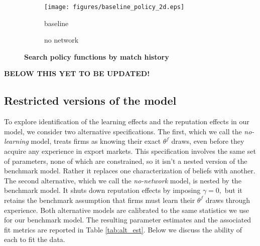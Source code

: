 \documentclass[12pt,titlepage]{article}
\begin{document}
\begin{figure}[tbp]
\centering%
\begin{subfigure}[b]{0.7\textwidth}
        \texttt{[image: figures/baseline\_policy\_2d.eps]}
        \caption{baseline}
        \label{fig:baseline_search_policy}
    \end{subfigure}
\par
\begin{subfigure}[b]{0.7\textwidth}
        \caption{no network}
        \label{fig:no_network_search_policy}
    \end{subfigure}
\caption{\textbf{Search policy functions by match history}}
\label{fig:search_policy_outer}
\end{figure}

\bigskip

\textbf{BELOW THIS YET TO BE UPDATED!}

\subsection{Restricted versions of the model}

To explore identification of the learning effects and the reputation effects
in our model, we consider two alternative specifications. The first, which
we call the \textit{no-learning} model, treats firms as knowing their exact $%
\theta ^{f}$ draws, even before they acquire any experience in export
markets. This specification involves the same set of parameters, none of
which are constrained, so it isn't a nested version of the benchmark model.
Rather it replaces one characterization of beliefs with another. The second
alternative, which we call the \textit{no-network} model, is nested by the
benchmark model. It shuts down reputation effects by imposing $\gamma =0,$
but it retains the benchmark assumption that firms must learn their $\theta
^{f}$ draws through experience. Both alternative models are calibrated to the same statistics we use for our
benchmark model. The resulting parameter estimates and the associated fit
metrics are reported in Table \ref{tab:alt_est}. Below we discuss the ability of each to
fit the data.\bigskip
\end{document}
